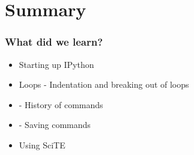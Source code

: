\documentclass[14pt,compress]{beamer}
\newcommand{\kwrd}[1]{ \texttt{\textbf{\color{blue}{#1}}}  }
\begin{document}
\section{Summary}
\begin{frame}[fragile]
  \frametitle{What did we learn?}
  \begin{itemize}
    \item Starting up IPython
    \item Loops - Indentation and breaking out of loops
    \item \kwrd{\%hist} - History of commands
    \item \kwrd{\%save} - Saving commands 
    \item Using SciTE
  \end{itemize}
\end{frame}
\end{document}
